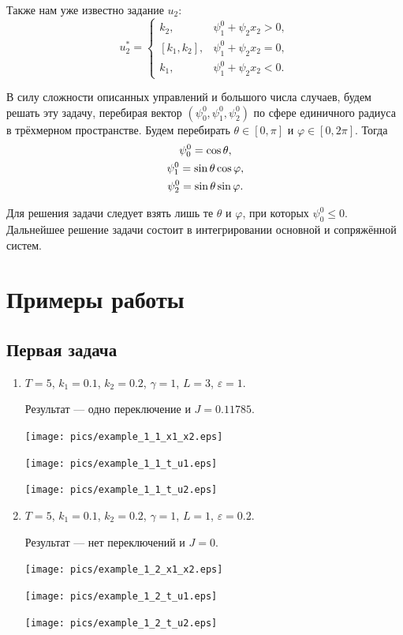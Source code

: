 \documentclass[11pt]{article}
\begin{document}
Также нам уже известно задание $u_2$:
$$
u_2^* =
\begin{cases}
k_2, & \psi_1^0 + \psi_2 x_2 > 0, \\
[k_1, k_2], & \psi_1^0 + \psi_2 x_2 = 0, \\
k_1, & \psi_1^0 + \psi_2 x_2 < 0.
\end{cases}
$$

В силу сложности описанных управлений и большого числа случаев, будем решать эту задачу, перебирая вектор $\left( \psi_0^0, \psi_1^0, \psi_2^0 \right)$ по сфере единичного радиуса в трёхмерном пространстве. Будем перебирать $\theta \in [0, \pi]$ и $\varphi \in [0, 2\pi]$. Тогда
\begin{gather}
\psi_0^0 = \cos \theta, \notag \\
\psi_1^0 = \sin \theta \cos \varphi, \notag \\
\psi_2^0 = \sin \theta \sin \varphi. \notag
\end{gather}

Для решения задачи следует взять лишь те $\theta$ и $\varphi$, при которых $\psi_0^0 \leqslant 0$. Дальнейшее решение задачи состоит в интегрировании основной и сопряжённой систем.

\section{Примеры работы}
\subsection{Первая задача}
\begin{enumerate}
\item
$T = 5$, $k_1 = 0.1$, $k_2 = 0.2$, $\gamma = 1$, $L = 3$, $\varepsilon = 1$.

Результат --- одно переключение и $J = 0.11785$.

\texttt{[image: pics/example\_1\_1\_x1\_x2.eps]}

\texttt{[image: pics/example\_1\_1\_t\_u1.eps]}

\texttt{[image: pics/example\_1\_1\_t\_u2.eps]}

\item
$T = 5$, $k_1 = 0.1$, $k_2 = 0.2$, $\gamma = 1$, $L = 1$, $\varepsilon = 0.2$.

Результат --- нет переключений и $J = 0$.

\texttt{[image: pics/example\_1\_2\_x1\_x2.eps]}

\texttt{[image: pics/example\_1\_2\_t\_u1.eps]}

\texttt{[image: pics/example\_1\_2\_t\_u2.eps]}

\end{enumerate}
\end{document}
